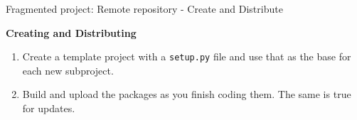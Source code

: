 \documentclass[10pt]{beamer}
\begin{document}

  

\begin{frame}[fragile]{Fragmented project: Remote repository - Create and Distribute}

  \textbf{Creating and Distributing}
  \begin{enumerate}
    \item Create a template project with a \texttt{setup.py} file and use that as the base for each new subproject.
    \item Build and upload the packages as you finish coding them. The same is true for updates.
  \end{enumerate}
  
\end{frame}
\end{document}

